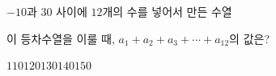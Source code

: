 $-10$과 $30$ 사이에 $12$개의 수를 넣어서 만든 수열 \par\smallskip{}\par\smallskip\noindent 이 등차수열을 이룰 때, $a_1+a_2+a_3+\cdots+a_{12}$의 값은?
\begin{choices32}{$110$}{$120$}{$130$}{$140$}{$150$}\end{choices32}
